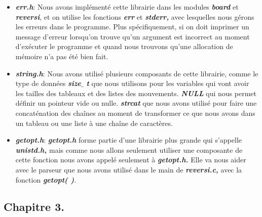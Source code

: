 \documentclass[a4paper,12pt]{article}
\begin{document}
\vspace{\baselineskip}
\begin{itemize}
	\item \textbf{\textit{err.h}}: Nous avons implémenté cette librairie dans les modules \textbf{\textit{board} }et \textbf{\textit{reversi}}, et on utilise les fonctions \textbf{\textit{err}} et \textbf{\textit{stderr, }}avec lesquelles nous gérons les erreurs dans le programme. Plus spécifiquement, si on doit imprimer un message d’erreur lorsqu’on trouve qu’un argument est incorrect au moment d’exécuter le programme et quand nous trouvons qu’une allocation de mémoire n’a pas été bien fait. \par


\vspace{\baselineskip}
	\item \textbf{\textit{string.h}}: Nous avons utilisé plusieurs composants de cette librairie, comme le type de données \textbf{\textit{size$ \_ $ t }}que nous utilisons pour les variables qui vont avoir les tailles des tableaux et des listes des mouvements. \textbf{\textit{NULL} }qui nous permet définir un pointeur vide ou nulle. \textbf{\textit{strcat }}que nous avons utilisé pour faire une concaténation des chaînes au moment de transformer ce que nous avons dans un tableau ou une liste à une chaîne de caractères. \par


\vspace{\baselineskip}
	\item \textbf{\textit{getopt.h}}: \textbf{\textit{getopt.h }}forme partie d’une librairie plus grande qui s’appelle \textbf{\textit{unistd.h, }}mais comme nous allons seulement utiliser une composante de cette fonction nous avons appelé seulement à \textbf{\textit{getopt.h. }}Elle va nous aider avec le parseur que nous avons utilisé dans le main de \textbf{\textit{reversi.c, }}avec la fonction \textbf{\textit{getopt( )}}.
\end{itemize}\par

\newpage

\vspace{\baselineskip}
\noindent \begin{Center}
\section{Chapitre 3.} 
\end{Center}\par
\end{document}
